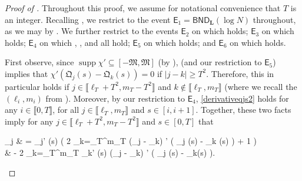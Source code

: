 \documentclass{amsart}
\numberwithin{equation}{section}
\DeclareMathOperator{\supp}{supp}
\theoremstyle{remark}
\theoremstyle{definition}
\begin{document}
	
	\begin{proof}[Proof of ]
		
		Throughout this proof, we assume for notational convenience that $T$ is an integer. Recalling , we restrict to the event $\mathsf{E}_1 = \mathsf{BND}_{\bm{L}} (\log N)$ throughout, as we may by . We further restrict to the events $\mathsf{E}_2$ on which  holds; $\mathsf{E}_3$ on which  holds; $\mathsf{E}_4$ on which , , and  all hold; $\mathsf{E}_5$ on which  holds; and $\mathsf{E}_6$ on which  holds.
		
		First observe, since $\supp \chi' \subseteq [-\mathfrak{M}, \mathfrak{M}]$ (by ),  (and our restriction to $\mathsf{E}_5$) implies that $\chi' (\mathfrak{Q}_j (s) - \mathfrak{Q}_k (s)) = 0$ if $|j-k| \ge T^2$. Therefore, this in particular holds if $j \in \llbracket \ell_T + T^2, m_T - T^2 \rrbracket$ and $k \notin \llbracket \ell_T, m_T \rrbracket$ (where we recall the $(\ell_i, m_i)$ from ). Moreover, by our restriction to $\mathsf{E}_4$, \eqref{derivativeqjs2} holds for any $i \in \llbracket 0, T \rrbracket$, for all $j \in \llbracket \ell_T, m_T \rrbracket$ and $s \in [i, i+1]$. Together, these two facts imply for any $j \in \llbracket \ell_T + T^2, m_T - T^2 \rrbracket$ and $s \in [0, T]$ that
		\begin{flalign}
			\label{lambdaqchi} 
			\begin{aligned} 
				\Lambda_j & = _j' (s) \cdot \Bigg( 2 \displaystyle\sum_{k=\ell_T}^{m_T}  (\Lambda_j - \Lambda_k) \cdot \chi' \big( \mathfrak{Q}_j (s) - _k (s) \big) + 1 \Bigg) \\
				& \qquad \qquad \qquad \qquad - 2 \displaystyle\sum_{k=\ell_T}^{m_T} _k' (s) \cdot {} (\Lambda_j - \Lambda_k) \cdot \chi' \big( \mathfrak{Q}_j (s) - _k(s) \big).
			\end{aligned} 
		\end{flalign}
		

\end{proof}
\end{document}
